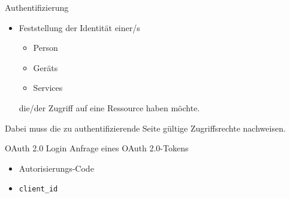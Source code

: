 

\begin{flashcard}[Definition]{Authentifizierung}
    \begin{itemize}
        \item Feststellung der Identität einer/s
        \begin{itemize}
            \item Person
            \item Geräts
            \item Services
        \end{itemize}
        die/der Zugriff auf eine Ressource haben möchte.
    \end{itemize}

    Dabei muss die zu authentifizierende Seite gültige Zugriffsrechte nachweisen.
\end{flashcard}



\begin{flashcard}[Definition]{OAuth 2.0 Login}
    Anfrage eines OAuth 2.0-Tokens
    \begin{itemize}
        \item Autorisierungs-Code
        \item \texttt{client\_id}
    \end{itemize}
\end{flashcard}

